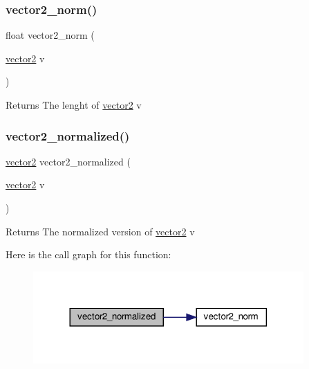 \subsubsection{\texorpdfstring{vector2\+\_\+norm()}{vector2\_norm()}}
{\footnotesize\ttfamily float vector2\+\_\+norm (\begin{DoxyParamCaption}\item[{\hyperlink{structvector2}{vector2}}]{v }\end{DoxyParamCaption})}

\begin{DoxyReturn}{Returns}
The lenght of \hyperlink{structvector2}{vector2} v 
\end{DoxyReturn}
\mbox{\label{group__vector2_gaa3e831b3dbed8e51233f48de98c3266e}} 
\subsubsection{\texorpdfstring{vector2\+\_\+normalized()}{vector2\_normalized()}}
{\footnotesize\ttfamily \hyperlink{structvector2}{vector2} vector2\+\_\+normalized (\begin{DoxyParamCaption}\item[{\hyperlink{structvector2}{vector2}}]{v }\end{DoxyParamCaption})}

\begin{DoxyReturn}{Returns}
The normalized version of \hyperlink{structvector2}{vector2} v 
\end{DoxyReturn}
Here is the call graph for this function\+:\nopagebreak
\begin{figure}[H]
\begin{center}
\leavevmode
\includegraphics[width=293pt]{group__vector2_gaa3e831b3dbed8e51233f48de98c3266e_cgraph}
\end{center}
\end{figure}
\mbox{\label{group__vector2_gab71f45ca9825acdbf70c639cf4a5d09c}} 
